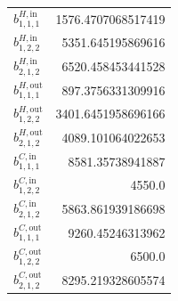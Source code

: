 \documentclass{article}%
\begin{document}
\begin{multicols*}{3}
\begin{supertabular}{lr}
	$b_{1,1,1}^{H,\text{in}}$ & 1576.4707068517419 \\%
	$b_{1,2,2}^{H,\text{in}}$ & 5351.645195869616 \\%
	$b_{2,1,2}^{H,\text{in}}$ & 6520.458453441528 \\%
	$b_{1,1,1}^{H,\text{out}}$ & 897.3756331309916 \\%
	$b_{1,2,2}^{H,\text{out}}$ & 3401.6451958696166 \\%
	$b_{2,1,2}^{H,\text{out}}$ & 4089.101064022653 \\%
	$b_{1,1,1}^{C,\text{in}}$ & 8581.35738941887 \\%
	$b_{1,2,2}^{C,\text{in}}$ & 4550.0 \\%
	$b_{2,1,2}^{C,\text{in}}$ & 5863.861939186698 \\%
	$b_{1,1,1}^{C,\text{out}}$ & 9260.45246313962 \\%
	$b_{1,2,2}^{C,\text{out}}$ & 6500.0 \\%
	$b_{2,1,2}^{C,\text{out}}$ & 8295.219328605574 \\%
\end{supertabular}%
\end{multicols*}%
\clearpage%
\end{document}
